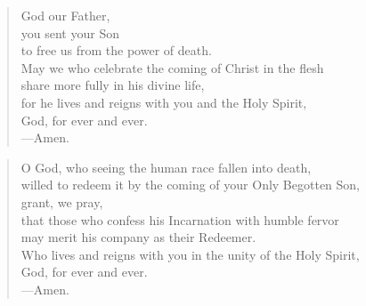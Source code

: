 \prayer

\setlength{\vleftmargin}{\prayerleftmargini}

\begin{verse}
God our Father,\\
you sent your Son\\
to free us from the power of death.\\
May we who celebrate the coming of Christ in the flesh\\
share more fully in his divine life,\\
for he lives and reigns with you and the Holy Spirit,\\
God, for ever and ever.\\
{\color{red}---\thinspace}Amen.
\end{verse}


\begin{verse}
O God, who seeing the human race fallen into death,\\
willed to redeem it by the coming of your Only Begotten Son,\\
grant, we pray,\\
that those who confess his Incarnation with humble fervor\\
may merit his company as their Redeemer.\\
Who lives and reigns with you in the unity of the Holy Spirit,\\
God, for ever and ever.\\
{\color{red}---\thinspace}Amen.

\end{verse}

\setlength{\vleftmargin}{\defleftmargini}